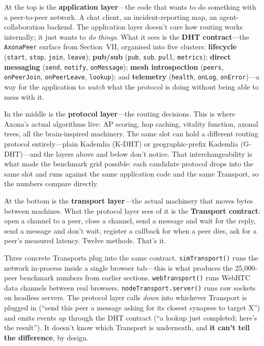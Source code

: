 \documentclass[nobib,justified]{tufte-handout}
\begin{document}
At the top is the \textbf{application layer}---the code that wants to do something with a peer-to-peer network. A chat client, an incident-reporting map, an agent-collaboration backend. The application layer doesn't care how routing works internally; it just wants to \emph{do things}. What it sees is the \textbf{DHT contract}---the \texttt{AxonaPeer} surface from Section~VII, organised into five clusters: \textbf{lifecycle} (\texttt{start}, \texttt{stop}, \texttt{join}, \texttt{leave}); \textbf{pub/sub} (\texttt{pub}, \texttt{sub}, \texttt{pull}, \texttt{metrics}); \textbf{direct messaging} (\texttt{send}, \texttt{notify}, \texttt{onMessage}); \textbf{mesh introspection} (\texttt{peers}, \texttt{onPeerJoin}, \texttt{onPeerLeave}, \texttt{lookup}); and \textbf{telemetry} (\texttt{health}, \texttt{onLog}, \texttt{onError})---a way for the application to \emph{watch} what the protocol is doing without being able to mess with it.

In the middle is the \textbf{protocol layer}---the routing decisions. This is where Axona's actual algorithms live: AP scoring, hop caching, vitality function, axonal trees, all the brain-inspired machinery. The same slot can hold a different routing protocol entirely---plain Kademlia (K-DHT) or geographic-prefix Kademlia (G-DHT)---and the layers above and below don't notice. That interchangeability is what made the benchmark grid possible: each candidate protocol drops into the same slot and runs against the same application code and the same Transport, so the numbers compare directly.

At the bottom is the \textbf{transport layer}---the actual machinery that moves bytes between machines. What the protocol layer sees of it is the \textbf{Transport contract}: open a channel to a peer, close a channel, send a message and wait for the reply, send a message and don't wait, register a callback for when a peer dies, ask for a peer's measured latency. Twelve methods. That's it.

{\sloppy Three concrete Transports plug into the same contract. \texttt{simTransport()} runs the network in-process inside a single browser tab---this is what produces the 25{,}000-peer benchmark numbers from earlier sections. \texttt{webTransport()} runs WebRTC data channels between real browsers. \texttt{nodeTransport.server()} runs raw sockets on headless servers. The protocol layer calls \emph{down} into whichever Transport is plugged in (``send this peer a message asking for its closest synapses to target X'') and emits events \emph{up} through the DHT contract (``a lookup just completed; here's the result''). It doesn't know which Transport is underneath, and \textbf{it can't tell the difference}, by design.\par}
\end{document}
